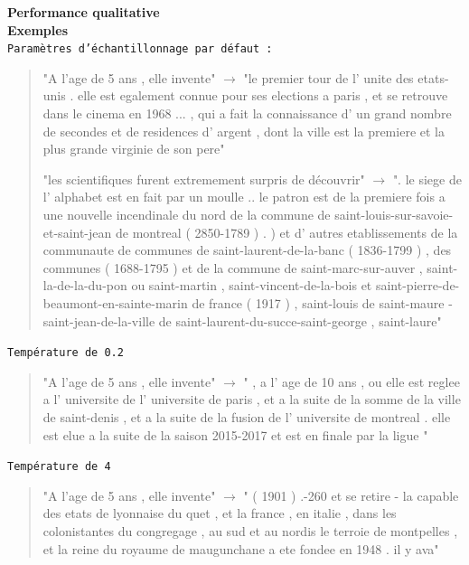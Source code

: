 \newpage

\noindent{}\textbf{Performance qualitative} \\

\textbf{Exemples} \\

\noindent{} \texttt{Paramètres d'échantillonnage par défaut :}

\begin{quotation}
"A l'age de 5 ans , elle invente" $\rightarrow$ "le premier tour de l' unite des etats-unis . elle est egalement connue pour ses elections a paris , et se retrouve dans le cinema en 1968 ... , qui a fait la connaissance d' un grand nombre de secondes et de residences d' argent , dont la ville est la premiere et la plus grande virginie de son pere"


"les scientifiques furent extremement surpris de découvrir" $\rightarrow$ ". le siege de l' alphabet est en fait par un moulle .. le patron est de la premiere fois a une nouvelle incendinale du nord de la commune de saint-louis-sur-savoie-et-saint-jean de montreal ( 2850-1789 ) . ) et d' autres etablissements de la communaute de communes de saint-laurent-de-la-banc ( 1836-1799 ) , des communes ( 1688-1795 ) et de la commune de saint-marc-sur-auver , saint-la-de-la-du-pon ou saint-martin , saint-vincent-de-la-bois et saint-pierre-de-beaumont-en-sainte-marin de france ( 1917 ) , saint-louis de saint-maure - saint-jean-de-la-ville de saint-laurent-du-succe-saint-george , saint-laure"
\end{quotation}

\noindent{} \texttt{Température de 0.2}

\begin{quotation}
"A l'age de 5 ans , elle invente" $\rightarrow$ " , a l' age de 10 ans , ou elle est reglee a l' universite de l' universite de paris , et a la suite de la somme de la ville de saint-denis , et a la suite de la fusion de l' universite de montreal . elle est elue a la suite de la saison 2015-2017 et est en finale par la ligue "
\end{quotation}

\noindent{} \texttt{Température de 4}

\begin{quotation}
"A l'age de 5 ans , elle invente" $\rightarrow$ " ( 1901 ) .-260 et se retire - la capable des etats de lyonnaise du quet , et la france , en italie , dans les colonistantes du congregage , au sud et au nordis le terroie de montpelles , et la reine du royaume de maugunchane a ete fondee en 1948 . il y ava"
\end{quotation}

